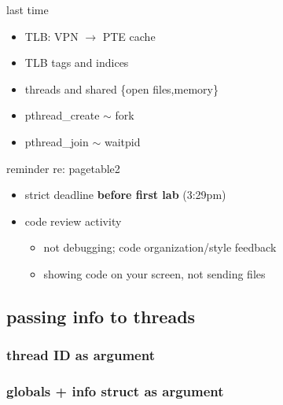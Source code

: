 \date{}
\title{}
\date{}

\begin{frame}
    \titlepage
\end{frame}



\begin{frame}{last time}
    \begin{itemize}
    \item TLB: VPN $\rightarrow$ PTE cache
    \item TLB tags and indices
    \vspace{.5cm}
    \item threads and shared \{open files,memory\}
    \item pthread\_create $\sim$ fork
    \item pthread\_join $\sim$ waitpid
    \end{itemize}
\end{frame}

\begin{frame}{reminder re: pagetable2}
    \begin{itemize}
    \item strict deadline \textbf{before first lab} (3:29pm)
    \item code review activity
        \begin{itemize}
        \item not debugging; code organization/style feedback
        \item showing code on your screen, not sending files
        \end{itemize}
    \end{itemize}
\end{frame}






\subsection{passing info to threads}

\subsubsection{thread ID as argument}


\subsubsection{globals + info struct as argument}



